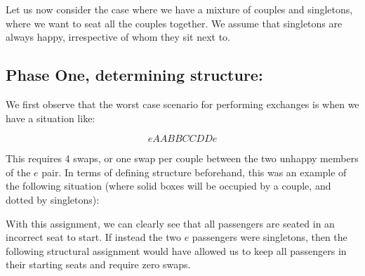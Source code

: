 \documentclass[11pt,twocolumn]{article}
\begin{document}
Let us now consider the case where we have a mixture of couples and singletons, where we want to seat all the couples together. We assume that singletons are always happy, irrespective of whom they sit next to.

\subsection{Phase One, determining structure:} 

We first observe that the worst case scenario for performing exchanges is when we have a situation like:

\begin{equation*}
eAABBCCDDe
\end{equation*}

This requires 4 swaps, or one swap per couple between the two unhappy members of the $e$ pair.  In terms of defining structure beforehand, this was an example of the following situation (where solid boxes will be occupied by a couple, and dotted by singletons):

\begin{figure}[H]
\centering
{}
\end{figure}

With this assignment, we can clearly see that all passengers are seated in an incorrect seat to start. If instead the two $e$ passengers were singletons, then the following structural assignment would have allowed us to keep all passengers in their starting seats and require zero swaps.

\begin{figure}[H]
\centering
{}
\end{figure}
\end{document}
